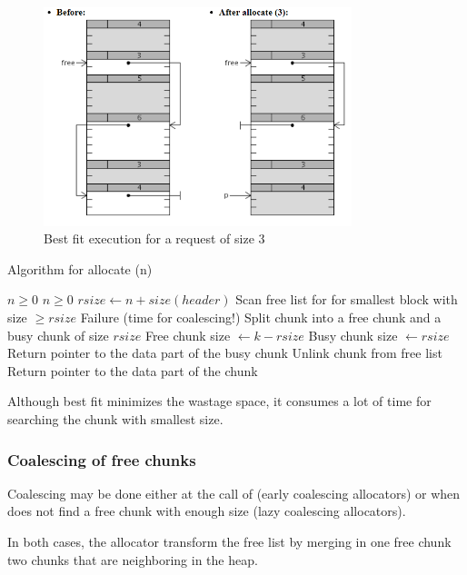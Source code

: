 \begin{figure}[htbp]
    \begin{center}
        \includegraphics[width=0.8\textwidth]{figures/BF_alg}
    \caption{Best fit execution for a request of size 3}
    \label{bf_alg}
    \end{center}
\end{figure}
\begin{algorithm}
\caption{Algorithm for allocate (n)}
\begin{algorithmic} 
\REQUIRE $n \geq 0$
\REQUIRE $n \geq 0$
\STATE $rsize \leftarrow n + size(header)$  
\STATE Scan free list for for smallest block with size $\geq rsize$ 
  \STATE Failure (time for coalescing!) 
   \STATE Split chunk into a free chunk and a busy chunk of size $rsize$
   \STATE Free chunk size $\leftarrow k - rsize$
   \STATE Busy chunk size $\leftarrow rsize$
    \STATE Return pointer to the data part of the busy chunk 
\ELSE 
    \STATE Unlink chunk from free list 
    \STATE Return pointer to the data part of the chunk 
\ENDIF
\end{algorithmic}
\end{algorithm}


Although best fit minimizes the wastage space, it consumes a lot of time for searching the chunk with smallest size.
 
\subsubsection{Coalescing of free chunks}

Coalescing may be done either at the call of  (early coalescing allocators) or 
when  does not find a free chunk with enough size (lazy coalescing allocators).

In both cases, the allocator transform the free list by merging in one free chunk two chunks that are neighboring in the heap.
